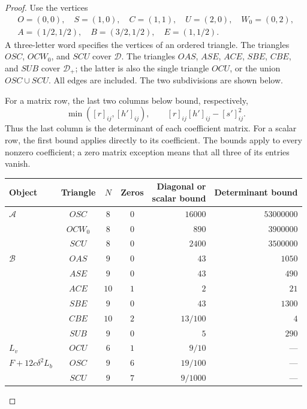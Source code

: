 \begin{proof}
Use the vertices
\[
\begin{gathered}
 O=(0,0),\quad S=(1,0),\quad C=(1,1),\quad
 U=(2,0),\quad W_0=(0,2),\\
 A=(1/2,1/2),\quad B=(3/2,1/2),\quad E=(1,1/2).
\end{gathered}
\]
A three-letter word specifies the vertices of an ordered triangle.
The triangles $OSC$, $OCW_0$, and $SCU$ cover $\mathcal D$.
The triangles $OAS$, $ASE$, $ACE$, $SBE$, $CBE$, and $SUB$ cover
$\mathcal D_+$; the latter is also the single triangle $OCU$, or the
union $OSC\cup SCU$. All edges are included. The two subdivisions are
shown below.



For a matrix row, the last two columns below bound, respectively,
\[
 \min([r]_{ij},[h']_{ij}),\qquad
 [r]_{ij}[h']_{ij}-[s']_{ij}^{2}.
\]
Thus the last column is the determinant of each coefficient matrix.
For a scalar row, the first bound applies directly to its coefficient.
The bounds apply to every nonzero coefficient; a zero matrix exception
means that all three of its entries vanish.
\begin{center}
\small
\begin{tabular}{@{}lcccrr@{}}
\toprule
Object & Triangle & $N$ & Zeros &
 \shortstack{Diagonal or\\scalar bound} & Determinant bound\\
\midrule
$\mathcal A$ & $OSC$ & $8$ & $0$ & $16000$ & $53000000$\\
 & $OCW_0$ & $8$ & $0$ & $890$ & $3900000$\\
 & $SCU$ & $8$ & $0$ & $2400$ & $3500000$\\
\midrule
$\mathcal B$ & $OAS$ & $9$ & $0$ & $43$ & $1050$\\
 & $ASE$ & $9$ & $0$ & $43$ & $490$\\
 & $ACE$ & $10$ & $1$ & $2$ & $21$\\
 & $SBE$ & $9$ & $0$ & $43$ & $1300$\\
 & $CBE$ & $10$ & $2$ & $13/100$ & $4$\\
 & $SUB$ & $9$ & $0$ & $5$ & $290$\\
\midrule
$L_v$ & $OCU$ & $6$ & $1$ & $9/10$ & ---\\
$F+12c\delta^2L_b$ & $OSC$ & $9$ & $6$ & $19/100$ & ---\\
 & $SCU$ & $9$ & $7$ & $9/1000$ & ---\\
\bottomrule
\end{tabular}
\end{center}


\end{proof}
